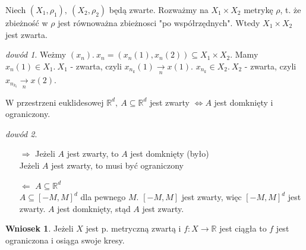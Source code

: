 \documentclass[twoside,10pt]{article}
\theoremstyle{definition}
\theoremstyle{definition}
\theoremstyle{definition}
\theoremstyle{definition}
\theoremstyle{remark}
\newtheorem*{dd}{dowód}
\theoremstyle{definition}
\theoremstyle{definition}
\newtheorem*{wn}{Wniosek}
\theoremstyle{definition}
\theoremstyle{definition}
\theoremstyle{definition}
\theoremstyle{definition}
\begin{document}
\begin{tw} 
    Niech $(X_1,\rho_1),\ (X_2,\rho_2)$ będą zwarte. Rozważmy na $X_1 \times X_2$ metrykę $\rho$, t. że
    zbieżność w $\rho$ jest równoważna zbieżnosci "po współrzędnych". Wtedy $X_1 \times X_2$ jest zwarta.
\end{tw} 
\begin{dd} 
    Weżmy $(x_n). \ x_n = (x_n(1), x_n(2)) \subseteq X_1 \times X_2$. Mamy $x_n(1) \in X_1. \ X_1$ - zwarta, czyli $x_{n_k}(1) \underset{n}{\rightarrow} x(1)$. 
    $x_{n_k} \in X_2. \ X_2$ - zwarta, czyli $x_{n_{k_l}} \underset{n}{\rightarrow} x(2)$. 
\end{dd} 
\begin{tw} W przestrzeni euklidesowej $\mathbb{R}^d, \ A \subseteq \mathbb{R}^d$ jest zwarty $\Leftrightarrow A$ jest domknięty i ograniczony. \end{tw} 
\begin{dd}\hfill 
    \begin{itemize} 
        \item[$\Rightarrow$] Jeżeli $A$ jest zwarty, to $A$ jest domknięty (było) \\ 
            Jeżeli $A$ jest zwarty, to musi być ograniczony
        \item[$\Leftarrow$] $A \subseteq \mathbb{R}^d$ \\ 
            $ A \subseteq [-M,M]^d$ dla pewnego $M$. $[-M,M]$ jest zwarty, więc $[-M,M]^d$ jest zwarty. 
            $A$ jest domknięty, stąd $A$ jest zwarty.
    \end{itemize} 
\end{dd} 
\begin{wn} Jeżeli $X$ jest p. metryczną zwartą i $f: X \rightarrow \mathbb{R}$ jest ciągła to $f$ jest ograniczona i osiąga swoje kresy. \end{wn}
\end{document}

